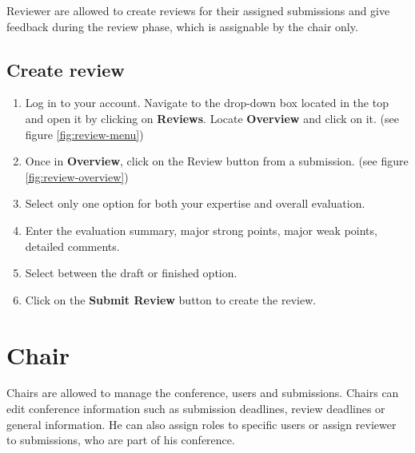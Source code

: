 \documentclass[nochapterpage,nopartpage,noheadingspace,numbersubsubsec,bigchapter,colorback,accentcolor=tud9c,10pt]{tudreport}
\begin{document}
Reviewer are allowed to create reviews for their assigned submissions and give feedback during the review phase, which is assignable by the chair only.

	\section{Create review}


\begin{enumerate}
	\item	Log in to your account. Navigate to the drop-down box located in the top and open it by clicking on \textbf{Reviews}. Locate \textbf{Overview} and click on it. (see figure \ref{fig:review-menu})
	\item	Once in \textbf{Overview}, click on the {Review} button from a submission. (see figure \ref{fig:review-overview})
	\item	Select only one option for both your expertise and overall evaluation.
	\item	Enter the evaluation summary, major strong points, major weak points, detailed comments.
	\item	Select between the draft or finished option.
	\item	Click on the \textbf{Submit Review} button to create the review.
\end{enumerate}


  \chapter{Chair}

Chairs are allowed to manage the conference, users and submissions. Chairs can edit conference information such as submission deadlines, review deadlines or general information. He can also assign roles to specific users or assign reviewer to submissions, who are part of his conference. 
\end{document}
